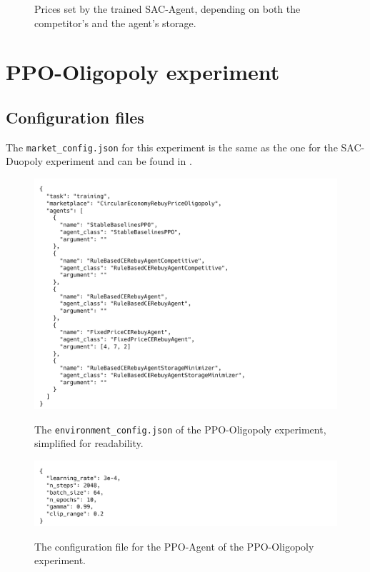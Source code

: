 \begin{figure}[ht]
\begin{subfigure}[t]{0.49\textwidth}
		\label{fig:AppendixSACDuopolyPolicyanalyser2rebuy}
	\end{subfigure}
	\caption{Prices set by the trained SAC-Agent, depending on both the competitor's and the agent's storage.}\label{fig:AppendixSACDuopolyPolicyanalyser2}
\end{figure}

\clearpage
\section{PPO-Oligopoly experiment}\label{sec:AppendixOligopoly}

\subsection{Configuration files}\label{subsec:AppendixOligopolyConfig}

The \texttt{market\_config.json} for this experiment is the same as the one for the SAC-Duopoly experiment and can be found in .

\begin{figure}[ht]
	\includegraphics[width = \textwidth]{images/configs/PPOOligopoly/PPOOligopolyEnvironment.png}\\
	\caption{The \texttt{environment\_config.json} of the PPO-Oligopoly experiment, simplified for readability.}\label{fig:PPOOligopolyConfigEnvironment}
\end{figure}

\begin{figure}[ht]
	\includegraphics[width = \textwidth]{images/configs/PPOOligopoly/PPOOligopolyAgent.png}\\
	\caption{The configuration file for the PPO-Agent of the PPO-Oligopoly experiment.}\label{fig:PPOOligopolyConfigAgent}
\end{figure}


